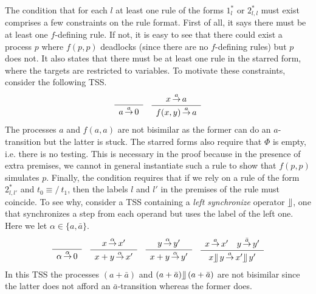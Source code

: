 The condition that for each $l$ at least one rule of the forms $1_l^*$ or $2_{l,l}^*$ must exist comprises a few constraints on the rule format.
First of all, it says there must be at least one \mbox{$f$-defining} rule.
If not, it is easy to see that there could exist a process $p$ where $f(p,p)$
deadlocks (since there are no \mbox{$f$-defining} rules) but $p$ does not.
It also states that there must be at
least one rule in the starred form,
where the targets are restricted to variables.
To motivate these constraints, consider the following TSS.
\[
    \sosrule{}{a \trans{a} 0} \quad
    \sosrule{x \trans{a} a}{f(x,y) \trans{a} a}
\]
The processes
$a$ and $f(a,a)$ are not bisimilar as the former can do an \mbox{$a$-transition} but the latter is stuck.
The starred forms also require that $\Phi$ is empty, i.e. there is no testing. This is necessary in the proof because in the presence
of extra premises, we cannot in general instantiate such a rule to show that $f(p,p)$ simulates $p$.
Finally, the condition requires that if we rely on a rule of the form $2_{l,l'}^*$
and $t_0 \equiv\!\!\!\!\!/~ t_1$, then the labels $l$ and $l'$ in the premises of the rule must coincide. To
see why, consider a TSS containing a {\em left synchronize} operator $\rrfloor$, one that synchronizes a step from each operand
but uses the label of the left one. Here we let $\alpha\in\{a,\bar{a}\}$.
\begin{equation*}
    \sosrule{}{\alpha \trans{\alpha} 0} \quad
    \sosrule{x \trans{\alpha} x'}{x + y \trans{\alpha} x' } \quad \sosrule{y \trans{\alpha} y'}{x + y \trans{\alpha} y' } \quad
    \sosrule{x \trans{a} x' \quad y \trans{\bar{a}} y'}{x\rrfloor\, y \trans{a} x'\rrfloor\, y'}
\end{equation*}
In this TSS the processes $(a + \bar{a})$ and $(a + \bar{a})\rrfloor\, (a + \bar{a})$ are not bisimilar
since the latter does not
afford an $\bar{a}$-transition whereas the former does.

%

